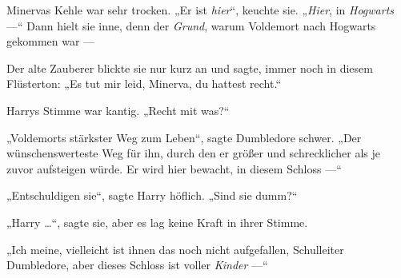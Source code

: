 %
Minervas Kehle war sehr trocken.
„Er ist \emph{hier}“, keuchte sie.
„\emph{Hier}, in \emph{Hogwarts} —“ Dann hielt sie inne, denn der \emph{Grund}, warum Voldemort nach Hogwarts gekommen war —

Der alte Zauberer blickte sie nur kurz an und sagte, immer noch in diesem Flüsterton:
„Es tut mir leid, Minerva, du hattest recht.“

Harrys Stimme war kantig.
„Recht mit was?“

„Voldemorts stärkster Weg zum Leben“, sagte Dumbledore schwer.
„Der wünschenswerteste Weg für ihn, durch den er größer und schrecklicher als je zuvor aufsteigen würde. Er wird hier bewacht, in diesem Schloss —“

„Entschuldigen sie“, sagte Harry höflich.
„Sind sie dumm?“

„Harry …“, sagte sie, aber es lag keine Kraft in ihrer Stimme.

„Ich meine, vielleicht ist ihnen das noch nicht aufgefallen, Schulleiter Dumbledore, aber dieses Schloss ist voller \emph{Kinder} —“

